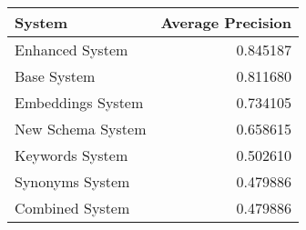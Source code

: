 \begin{tabular}{lr}
\toprule
System & Average Precision \\
\midrule
Enhanced System & 0.845187 \\
Base System & 0.811680 \\
Embeddings System & 0.734105 \\
New Schema System & 0.658615 \\
Keywords System & 0.502610 \\
Synonyms System & 0.479886 \\
Combined System & 0.479886 \\
\bottomrule
\end{tabular}
